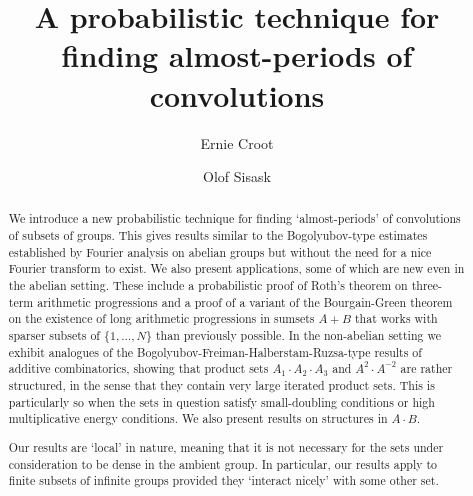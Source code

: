 \documentclass[12pt,a4paper,reqno]{amsart}
\title[Finding almost-periods probabilistically]{A probabilistic technique for finding almost-periods of convolutions}
\author{Ernie Croot}
\author{Olof Sisask}
\numberwithin{equation}{section}
\theoremstyle{plain}
\theoremstyle{definition}
\begin{document}
\begin{abstract}
We introduce a new probabilistic technique for finding `almost-periods' of convolutions of subsets of groups. This gives results similar to the Bogolyubov-type estimates established by Fourier analysis on abelian groups but without the need for a nice Fourier transform to exist. We also present applications, some of which are new even in the abelian setting. These include a probabilistic proof of Roth's theorem on three-term arithmetic progressions and a proof of a variant of the Bourgain-Green theorem on the existence of long arithmetic progressions in sumsets $A+B$ that works with sparser subsets of $\{1, \ldots, N\}$ than previously possible.
In the non-abelian setting we exhibit analogues of the Bogolyubov-Freiman-Halberstam-Ruzsa-type results of additive combinatorics, showing that product sets $A_1 \cdot A_2 \cdot A_3$ and $A^2 \cdot A^{-2}$ are rather structured, in the sense that they contain very large iterated product sets. This is particularly so when the sets in question satisfy small-doubling conditions or high multiplicative energy conditions. We also present results on structures in $A \cdot B$.

Our results are `local' in nature, meaning that it is not necessary for the sets under consideration to be dense in the ambient group. In particular, our results apply to finite subsets of infinite groups provided they `interact nicely' with some other set.
\end{abstract}

\maketitle

\tableofcontents

\parindent 0mm
\parskip   4mm
\end{document}
